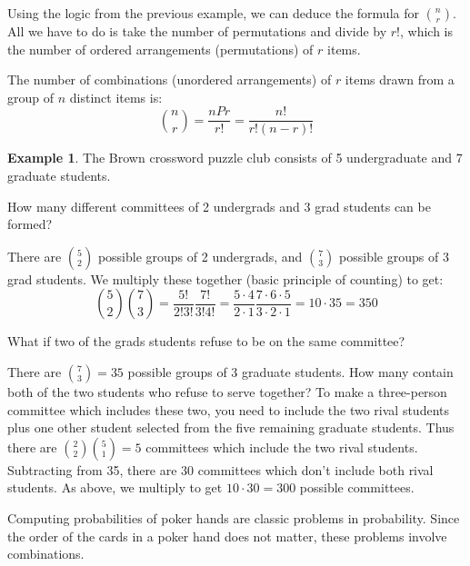\documentclass[12pt]{article}
\theoremstyle{definition}
\newtheorem*{example}{Example}
\theoremstyle{remark}
\begin{document}
Using the logic from the previous example, we can deduce the formula for $\binom{n}{r}$. All we have to do is take the number of permutations and divide by $r!$, which is the number of ordered arrangements (permutations) of $r$ items.

\begin{framed}
The number of combinations (unordered arrangements) of $r$ items drawn from a group of $n$ distinct items is:
\[
\binom{n}{r} = \frac{nPr}{r!} = \frac{n!}{r!(n-r)!}
\]
\end{framed}

\begin{example}The Brown crossword puzzle club consists of 5 undergraduate and 7 graduate students.
\item How many different committees of 2 undergrads and 3 grad students can be formed?

There are $\binom{5}{2}$ possible groups of 2 undergrads, and $\binom{7}{3}$ possible groups of 3 grad students. We multiply these together (basic principle of counting) to get:
\[
\binom{5}{2} \binom{7}{3}  = \frac{5!}{2!3!} \frac{7!}{3!4!} = \frac{5\cdot4}{2\cdot1} \frac{7\cdot6\cdot5}{3\cdot2\cdot1} = 10 \cdot 35 = 350
\]

\item What if two of the grads students refuse to be on the same committee?

There are $\binom{7}{3} = 35$ possible groups of 3 graduate students. How many contain both of the two students who refuse to serve together? To make a three-person committee which includes these two, you need to include the two rival students plus one other student selected from the five remaining graduate students. Thus there are $\binom{2}{2}\binom{5}{1} = 5$ committees which include the two rival students. Subtracting from 35, there are 30 committees which don't include both rival students. As above, we multiply to get $10 \cdot 30 = 300$ possible committees.
\end{example}

Computing probabilities of poker hands are classic problems in probability. Since the order of the cards in a poker hand does not matter, these problems involve combinations.
\end{document}
